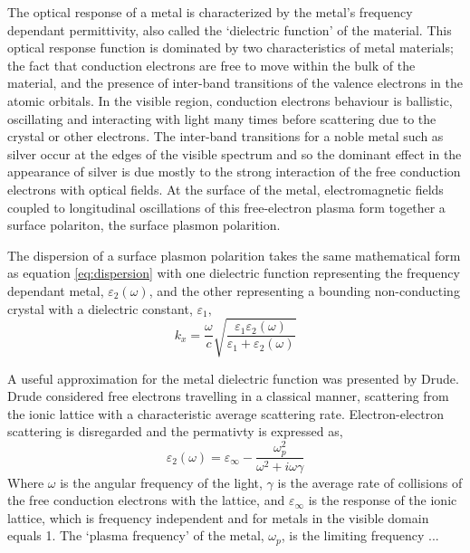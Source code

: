 \documentclass[oneside,10pt,a4paper]{book}
\begin{document}
The optical response of a metal is characterized by the metal's frequency dependant permittivity, also called the `dielectric function' of the material. This optical response function is dominated by two characteristics of metal materials; the fact that conduction electrons are free to move within the bulk of the material, and the presence of inter-band transitions of the valence electrons in the atomic orbitals. In the visible region, conduction electrons behaviour is ballistic, oscillating and interacting with light many times before scattering due to the crystal or other electrons. The inter-band transitions for a noble metal such as silver occur at the edges of the visible spectrum and so the dominant effect in the appearance of silver is due mostly to the strong interaction of the free conduction electrons with optical fields. At the surface of the metal, electromagnetic fields coupled to longitudinal oscillations of this free-electron plasma form together a surface polariton, the surface plasmon polarition.

The dispersion of a surface plasmon polarition takes the same mathematical form as equation \ref{eq:dispersion} with one dielectric function representing the frequency dependant metal, $\varepsilon_2(\omega)$, and the other representing a bounding non-conducting crystal with a dielectric constant, $\varepsilon_1,$
\begin{equation}
k_x=\frac{\omega}{c}\sqrt{\frac{\varepsilon_1\varepsilon_2(\omega)}{\varepsilon_1+\varepsilon_2(\omega)}}\label{eq:spp-dispersion}
\end{equation}

A useful approximation for the metal dielectric function was presented by Drude. Drude considered free electrons travelling in a classical manner, scattering from the ionic lattice with a characteristic average scattering rate. Electron-electron scattering is disregarded and the permativty is expressed as,
\begin{equation}
\varepsilon_2(\omega)=\varepsilon_\infty-\frac{\omega_p^2}{\omega^2+i\omega\gamma}\label{eq:drude}
\end{equation}
Where $\omega$ is the angular frequency of the light, $\gamma$ is the average rate of collisions of the free conduction electrons with the lattice, and $\varepsilon_\infty$ is the response of the ionic lattice, which is frequency independent and for metals in the visible domain equals 1. The `plasma frequency' of the metal, $\omega_p$, is the limiting frequency ...
\end{document}
